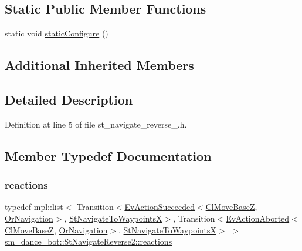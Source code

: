 \subsection*{Static Public Member Functions}
\begin{DoxyCompactItemize}
\item 
static void \hyperlink{structsm__dance__bot_1_1StNavigateReverse2_ae4809f28ccc5378f7a8f3c829d29d925}{static\+Configure} ()
\end{DoxyCompactItemize}
\subsection*{Additional Inherited Members}


\subsection{Detailed Description}


Definition at line 5 of file st\+\_\+navigate\+\_\+reverse\+\_.\+h.



\subsection{Member Typedef Documentation}
\mbox{\label{structsm__dance__bot_1_1StNavigateReverse2_a629dbeb24a7b120d7dfebeb4b9630d64}} 
\subsubsection{\texorpdfstring{reactions}{reactions}}
{\footnotesize\ttfamily typedef mpl\+::list$<$ Transition$<$\hyperlink{structsmacc_1_1default__events_1_1EvActionSucceeded}{Ev\+Action\+Succeeded}$<$\hyperlink{classcl__move__base__z_1_1ClMoveBaseZ}{Cl\+Move\+BaseZ}, \hyperlink{classsm__dance__bot_1_1OrNavigation}{Or\+Navigation}$>$, \hyperlink{structsm__dance__bot_1_1StNavigateToWaypointsX}{St\+Navigate\+To\+WaypointsX}$>$, Transition$<$\hyperlink{structsmacc_1_1default__events_1_1EvActionAborted}{Ev\+Action\+Aborted}$<$\hyperlink{classcl__move__base__z_1_1ClMoveBaseZ}{Cl\+Move\+BaseZ}, \hyperlink{classsm__dance__bot_1_1OrNavigation}{Or\+Navigation}$>$, \hyperlink{structsm__dance__bot_1_1StNavigateToWaypointsX}{St\+Navigate\+To\+WaypointsX}$>$ $>$ \hyperlink{structsm__dance__bot_1_1StNavigateReverse2_a629dbeb24a7b120d7dfebeb4b9630d64}{sm\+\_\+dance\+\_\+bot\+::\+St\+Navigate\+Reverse2\+::reactions}}



